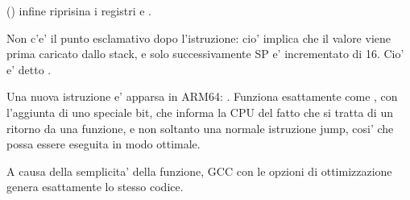  () infine riprisina i registri  e .

Non c'e' il punto esclamativo dopo l'istruzione: cio' implica che il valore viene prima caricato dallo stack, e solo successivamente 
\ac{SP} e' incrementato di 16.
Cio' e' detto .

Una nuova istruzione e' apparsa in ARM64: \RET. 
Funziona esattamente come , con l'aggiunta di uno speciale  bit, che informa la \ac{CPU}
del fatto che si tratta di un ritorno da una funzione, e non soltanto una normale istruzione jump, cosi' che possa 
essere eseguita in modo ottimale.

A causa della semplicita' della funzione, GCC con le opzioni di ottimizzazione genera esattamente lo stesso codice.
